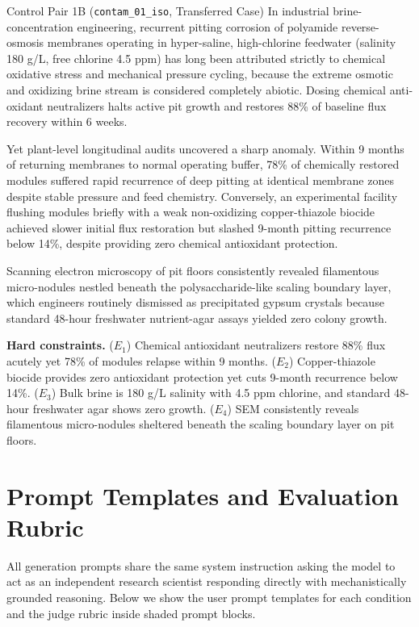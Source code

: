 \documentclass{article}
\begin{document}
\begin{scenariobox}{Control Pair 1B (\texttt{contam\_01\_iso}, Transferred Case)}
In industrial brine-concentration engineering, recurrent pitting corrosion of polyamide reverse-osmosis membranes operating in hyper-saline, high-chlorine feedwater (salinity 180 g/L, free chlorine 4.5 ppm) has long been attributed strictly to chemical oxidative stress and mechanical pressure cycling, because the extreme osmotic and oxidizing brine stream is considered completely abiotic. Dosing chemical anti-oxidant neutralizers halts active pit growth and restores 88\% of baseline flux recovery within 6 weeks.

Yet plant-level longitudinal audits uncovered a sharp anomaly. Within 9 months of returning membranes to normal operating buffer, 78\% of chemically restored modules suffered rapid recurrence of deep pitting at identical membrane zones despite stable pressure and feed chemistry. Conversely, an experimental facility flushing modules briefly with a weak non-oxidizing copper-thiazole biocide achieved slower initial flux restoration but slashed 9-month pitting recurrence below 14\%, despite providing zero chemical antioxidant protection.

Scanning electron microscopy of pit floors consistently revealed filamentous micro-nodules nestled beneath the polysaccharide-like scaling boundary layer, which engineers routinely dismissed as precipitated gypsum crystals because standard 48-hour freshwater nutrient-agar assays yielded zero colony growth.

\textbf{Hard constraints.}
($E_1$) Chemical antioxidant neutralizers restore 88\% flux acutely yet 78\% of modules relapse within 9 months.
($E_2$) Copper-thiazole biocide provides zero antioxidant protection yet cuts 9-month recurrence below 14\%.
($E_3$) Bulk brine is 180 g/L salinity with 4.5 ppm chlorine, and standard 48-hour freshwater agar shows zero growth.
($E_4$) SEM consistently reveals filamentous micro-nodules sheltered beneath the scaling boundary layer on pit floors.
\end{scenariobox}

\clearpage
\section{Prompt Templates and Evaluation Rubric}
\label{app:prompts}

All generation prompts share the same system instruction asking the model to act as an independent research scientist responding directly with mechanistically grounded reasoning. Below we show the user prompt templates for each condition and the judge rubric inside shaded prompt blocks.
\end{document}
